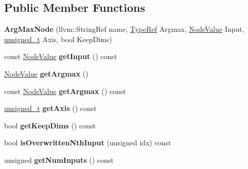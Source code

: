 \subsection*{Public Member Functions}
\begin{DoxyCompactItemize}
\item 
\mbox{\label{classglow_1_1_arg_max_node_a6b97ea35485a44afc1bc12299d199bf0}} 
{\bfseries Arg\+Max\+Node} (llvm\+::\+String\+Ref name, \hyperlink{structglow_1_1_type}{Type\+Ref} Argmax, \hyperlink{structglow_1_1_node_value}{Node\+Value} Input, \hyperlink{namespaceglow_a0ca574644e1e42ef193a9947fb4d8911}{unsigned\+\_\+t} Axis, bool Keep\+Dims)
\item 
\mbox{\label{classglow_1_1_arg_max_node_a29a4cc81a97f730903c7a898891f9118}} 
const \hyperlink{structglow_1_1_node_value}{Node\+Value} {\bfseries get\+Input} () const
\item 
\mbox{\label{classglow_1_1_arg_max_node_a0886b9c18ecb6f1fcd8368b7be903334}} 
\hyperlink{structglow_1_1_node_value}{Node\+Value} {\bfseries get\+Argmax} ()
\item 
\mbox{\label{classglow_1_1_arg_max_node_a3d2598dac1ea1ec24d2eb2c716f69ce7}} 
const \hyperlink{structglow_1_1_node_value}{Node\+Value} {\bfseries get\+Argmax} () const
\item 
\mbox{\label{classglow_1_1_arg_max_node_ad001eeff4b6fb29c2caeb9156e55a80f}} 
\hyperlink{namespaceglow_a0ca574644e1e42ef193a9947fb4d8911}{unsigned\+\_\+t} {\bfseries get\+Axis} () const
\item 
\mbox{\label{classglow_1_1_arg_max_node_a8c195b271115961b9ab6dc8a87d38ec5}} 
bool {\bfseries get\+Keep\+Dims} () const
\item 
\mbox{\label{classglow_1_1_arg_max_node_aef1cc960fc22360a24f9d1f9b243f48d}} 
bool {\bfseries is\+Overwritten\+Nth\+Input} (unsigned idx) const
\item 
\mbox{\label{classglow_1_1_arg_max_node_a0e105e38c5dfc6889861cabc39709211}} 
unsigned {\bfseries get\+Num\+Inputs} () const

\end{DoxyCompactItemize}

